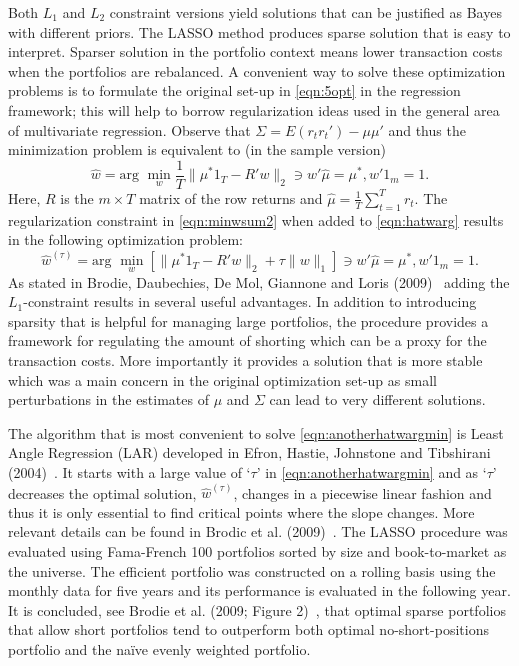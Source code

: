 Both $L_1$ and $L_2$ constraint versions yield solutions that can be justified as Bayes with different priors. The LASSO method produces sparse solution that is easy to interpret. Sparser solution in the portfolio context means lower transaction costs when the portfolios are rebalanced. A convenient way to solve these optimization problems is to formulate the original set-up in \eqref{eqn:5opt} in the regression framework; this will help to borrow regularization ideas used in the general area of multivariate regression. Observe that $\Sigma= E(r_tr_t') - \mu\mu'$ and thus the minimization problem is equivalent to (in the sample version)
	\begin{equation} \label{eqn:hatwarg}
	\hat{w}= \text{arg }\min_w \dfrac{1}{T} \| \mu^*1_T - R'w\|_2 \ni w'\hat{\mu} = \mu^*, w'1_m=1.
	\end{equation}
Here, $R$ is the $m\times T$ matrix of the row returns and $\hat{\mu}=\frac{1}{T}\sum_{t=1}^T r_t$. The regularization constraint in \eqref{eqn:minwsum2} when added to \eqref{eqn:hatwarg} results in the following optimization problem:
	\begin{equation}\label{eqn:anotherhatwargmin}
	\hat{w}^{(\tau)}= \text{arg } \min_w [ \|\mu^* 1_T - R'w\|_2 + \tau\|w\|_1] \ni w' \hat{\mu} = \mu^*, w'1_m=1.
	\end{equation}
As stated in Brodie, Daubechies, De Mol, Giannone and Loris (2009)~\cite{brodic} adding the $L_1$-constraint results in several useful advantages. In addition to introducing sparsity that is helpful for managing large portfolios, the procedure provides a framework for regulating the amount of shorting which can be a proxy for the transaction costs. More importantly it provides a solution that is more stable which was a main concern in the original optimization set-up as small perturbations in the estimates of $\mu$ and $\Sigma$ can lead to very different solutions.


The algorithm that is most convenient to solve \eqref{eqn:anotherhatwargmin} is Least Angle Regression (LAR) developed in Efron, Hastie, Johnstone and Tibshirani (2004)~\cite{efron}. It starts with a large value of `$\tau$' in \eqref{eqn:anotherhatwargmin} and as `$\tau$' decreases the optimal solution, $\hat{w}^{(\tau)}$, changes in a piecewise linear fashion and thus it is only essential to find critical points where the slope changes. More relevant details can be found in Brodic et al. (2009)~\cite{brodic}. The LASSO procedure was evaluated using Fama-French 100 portfolios sorted by size and book-to-market as the universe. The efficient portfolio was constructed on a rolling basis using the monthly data for five years and its performance is evaluated in the following year. It is concluded, see Brodie et al. (2009; Figure 2)~\cite{brodic}, that optimal sparse portfolios that allow short portfolios tend to outperform both optimal no-short-positions portfolio and the na\"ive evenly weighted portfolio. 



